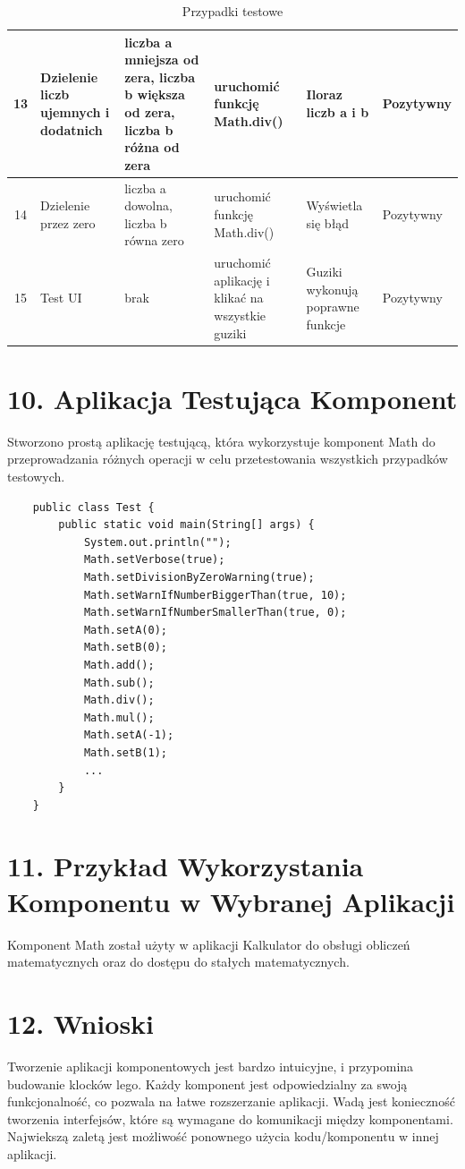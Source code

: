 \documentclass{article}
\begin{document}
\begin{table}[htbp]
{\begin{tabular}{|c|p{2.5cm}|p{3cm}|p{3cm}|p{3cm}|p{2cm}|}
        \hline
        13 & Dzielenie liczb ujemnych i dodatnich & liczba a mniejsza od zera, liczba b większa od zera, liczba b różna od zera & uruchomić funkcję Math.div() & Iloraz liczb a i b & Pozytywny \\
        \hline
        14 & Dzielenie przez zero & liczba a dowolna, liczba b równa zero & uruchomić funkcję Math.div() & Wyświetla się błąd & Pozytywny \\
        \hline
        15 & Test UI & brak & uruchomić aplikację i klikać na wszystkie guziki & Guziki wykonują poprawne funkcje & Pozytywny \\
        \hline
    \end{tabular}%
    }
    \caption{Przypadki testowe}
\end{table}
\newpage
\section*{10. Aplikacja Testująca Komponent}

Stworzono prostą aplikację testującą, która wykorzystuje komponent Math do przeprowadzania różnych operacji w celu przetestowania wszystkich przypadków testowych.

\begin{verbatim}
    public class Test {
        public static void main(String[] args) {
            System.out.println("");
            Math.setVerbose(true);
            Math.setDivisionByZeroWarning(true);
            Math.setWarnIfNumberBiggerThan(true, 10);
            Math.setWarnIfNumberSmallerThan(true, 0);
            Math.setA(0);
            Math.setB(0);
            Math.add();
            Math.sub();
            Math.div();
            Math.mul();
            Math.setA(-1);
            Math.setB(1);
            ...
        }
    }
\end{verbatim}

\section*{11. Przykład Wykorzystania Komponentu w Wybranej Aplikacji}

Komponent Math został użyty w aplikacji Kalkulator do obsługi obliczeń matematycznych oraz do dostępu do stałych matematycznych.

\section*{12. Wnioski}

Tworzenie aplikacji komponentowych jest bardzo intuicyjne, i przypomina budowanie klocków lego.
Każdy komponent jest odpowiedzialny za swoją funkcjonalność, co pozwala na łatwe rozszerzanie aplikacji.
Wadą jest konieczność tworzenia interfejsów, które są wymagane do komunikacji między komponentami.
Najwiekszą zaletą jest możliwość ponownego użycia kodu/komponentu w innej aplikacji.
\end{document}
